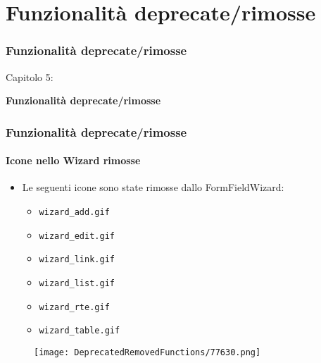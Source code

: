 %

\section{Funzionalità deprecate/rimosse}
\begin{frame}[fragile]
	\frametitle{Funzionalità deprecate/rimosse}

	\begin{center}\huge{Capitolo 5:}\end{center}
	\begin{center}\huge{\color{typo3darkgrey}\textbf{Funzionalità deprecate/rimosse}}\end{center}

\end{frame}

\begin{frame}[fragile]
	\frametitle{Funzionalità deprecate/rimosse}
	\framesubtitle{Icone nello Wizard rimosse}

	\begin{itemize}

		\item Le seguenti icone sono state rimosse dallo FormFieldWizard:

			\begin{itemize}
				\item \texttt{wizard\_add.gif}
				\item \texttt{wizard\_edit.gif}
				\item \texttt{wizard\_link.gif}
				\item \texttt{wizard\_list.gif}
				\item \texttt{wizard\_rte.gif}
				\item \texttt{wizard\_table.gif}
			\end{itemize}

	\end{itemize}

	\begin{figure}
		\texttt{[image: DeprecatedRemovedFunctions/77630.png]}
	\end{figure}

\end{frame}

